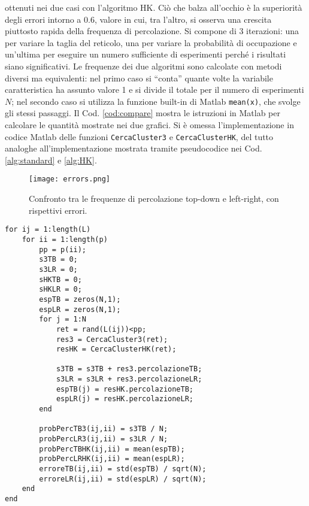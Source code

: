 ottenuti nei due casi con l'algoritmo HK. Ciò che balza all'occhio è la 
superiorità degli errori intorno a $0.6$, valore in cui, tra l'altro, 
si osserva una crescita piuttosto rapida della frequenza di percolazione.
Si compone di 3 iterazioni: una per variare la 
taglia del reticolo, una per variare la probabilità di occupazione e un'ultima per 
eseguire un numero sufficiente di esperimenti perché i risultati siano significativi.
Le frequenze dei due algoritmi sono calcolate con metodi diversi ma equivalenti:
nel primo caso si ``conta'' quante volte la variabile caratteristica ha assunto valore 1
e si divide il totale per il numero di esperimenti $N$; nel secondo caso si utilizza la 
funzione built-in di Matlab \texttt{mean(x)}, che svolge gli stessi passaggi.
Il Cod. \ref{cod:compare} mostra le istruzioni in Matlab per calcolare le quantità 
mostrate nei due grafici. Si è omessa l'implementazione in codice Matlab delle funzioni 
\texttt{CercaCluster3} e \texttt{CercaClusterHK}, del tutto analoghe all'implementazione 
mostrata tramite pseudocodice nei Cod. \ref{alg:standard} e \ref{alg:HK}.
\begin{figure}[ht]
    \texttt{[image: errors.png]}
    \caption{Confronto tra le frequenze di percolazione top-down e left-right,
    con rispettivi errori.}
    \label{fig:th_errors}
\end{figure}
\begin{lstlisting}[caption={Porzione di codice relativa al confronto tra algoritmi e 
    alla frequenza di percolazione top-down e left-right.}, label={cod:compare}]
for ij = 1:length(L)
    for ii = 1:length(p)
        pp = p(ii);
        s3TB = 0;
        s3LR = 0;
        sHKTB = 0;
        sHKLR = 0;
        espTB = zeros(N,1);
        espLR = zeros(N,1);
        for j = 1:N
            ret = rand(L(ij))<pp;
            res3 = CercaCluster3(ret);
            resHK = CercaClusterHK(ret);

            s3TB = s3TB + res3.percolazioneTB;
            s3LR = s3LR + res3.percolazioneLR;
            espTB(j) = resHK.percolazioneTB;
            espLR(j) = resHK.percolazioneLR;
        end

        probPercTB3(ij,ii) = s3TB / N;
        probPercLR3(ij,ii) = s3LR / N;
        probPercTBHK(ij,ii) = mean(espTB);
        probPercLRHK(ij,ii) = mean(espLR);
        erroreTB(ij,ii) = std(espTB) / sqrt(N);
        erroreLR(ij,ii) = std(espLR) / sqrt(N);
    end
end
\end{lstlisting}

